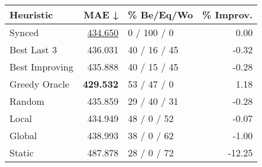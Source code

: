 \begin{tabular}{lrlr}
\toprule
\textbf{Heuristic} & \textbf{MAE ↓} & \textbf{\% Be/Eq/Wo} & \textbf{\% Improv.} \\
\midrule
            Synced &        \underline{434.650} &          0 / 100 / 0 &                0.00 \\
\midrule
       Best Last 3 &        436.031 &         40 / 16 / 45 &               -0.32 \\
    Best Improving &        435.888 &         40 / 15 / 45 &               -0.28 \\
\addlinespace
     Greedy Oracle &        \textbf{429.532} &          53 / 47 / 0 &                1.18 \\
            Random &        435.859 &         29 / 40 / 31 &               -0.28 \\
\midrule
             Local &        434.949 &          48 / 0 / 52 &               -0.07 \\
            Global &        438.993 &          38 / 0 / 62 &               -1.00 \\
\midrule
            Static &        487.878 &          28 / 0 / 72 &              -12.25 \\
\bottomrule
\end{tabular}

\label{tab:iid_lr05_le2_bs4_Summary}

